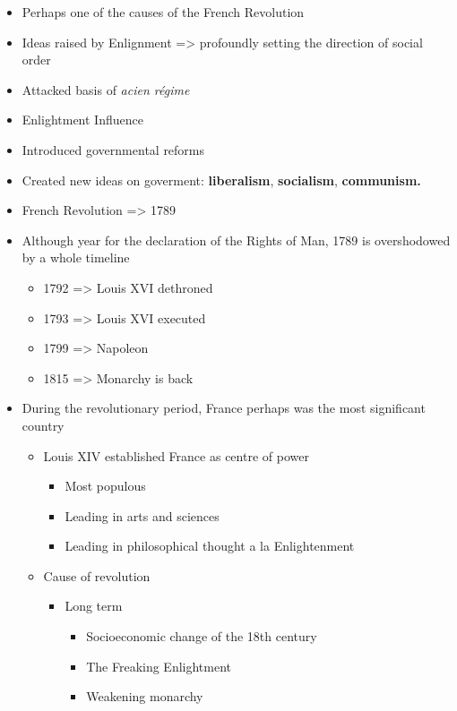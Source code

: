 \documentclass[letterpaper]{article}
\begin{document}
\begin{itemize}
\item Perhaps one of the causes of the French Revolution
\item Ideas raised by Enlignment => profoundly setting the direction of
social order
\item Attacked basis of \emph{acien régime}
\item Enlightment Influence
\item Introduced governmental reforms
\item Created new ideas on goverment: \textbf{liberalism}, \textbf{socialism},
\textbf{communism.}
\item French Revolution => 1789
\item Although year for the declaration of the Rights of Man, 1789 is
overshodowed by a whole timeline

\begin{itemize}
\item 1792 => Louis XVI dethroned
\item 1793 => Louis XVI executed
\item 1799 => Napoleon
\item 1815 => Monarchy is back
\end{itemize}

\item During the revolutionary period, France perhaps was the most
significant country

\begin{itemize}
\item Louis XIV established France as centre of power

\begin{itemize}
\item Most populous
\item Leading in arts and sciences
\item Leading in philosophical thought a la Enlightenment
\end{itemize}

\item Cause of revolution

\begin{itemize}
\item Long term

\begin{itemize}
\item Socioeconomic change of the 18th century
\item The Freaking Enlightment
\item Weakening monarchy\\
\end{itemize}


\end{itemize}
\end{itemize}
\end{itemize}
\end{document}
